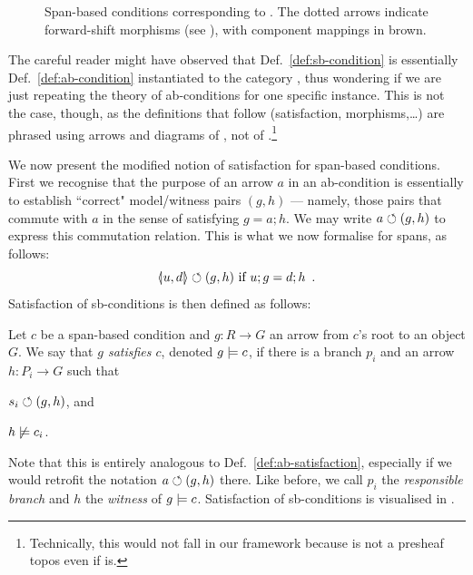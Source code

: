 \begin{figure}[t]
\centering

\vspace*{-5mm}
\caption{Span-based conditions corresponding to . The dotted arrows indicate forward-shift morphisms (see ), with component mappings in brown.}
\end{figure}

\medskip\noindent The careful reader might have observed that Def.~\ref{def:sb-condition} is essentially Def.~\ref{def:ab-condition} instantiated to the category {\SpanC}, thus wondering if we are just repeating the theory of ab-conditions for one specific instance. This is not the case, though, as the definitions that follow (satisfaction, morphisms,\ldots) are phrased using arrows and diagrams of , not of {\SpanC}.\footnote{Technically, this would not fall in our framework because {\SpanC} is not a presheaf topos even if  is.}

We now present the modified notion of satisfaction for span-based conditions. First we recognise that the purpose of an arrow $a$ in an ab-condition is essentially to establish ``correct" model/witness pairs $(g,h)$ --- namely, those pairs that commute with $a$ in the sense of satisfying $g=a;h$. We may write $a\circlearrowleft (g,h)$ to express this commutation relation. This is what we now formalise for spans, as follows:
\[ \spanof u d \commutes (g,h) \text{ if } u;g=d;h \enspace. \]
Satisfaction of sb-conditions is then defined as follows:

\begin{definition}\label{def:sb-satisfaction}
  Let $c$ be a span-based condition and $g:R\to G$ an arrow from $c$'s root to an object $G$. We say that \emph{$g$ satisfies $c$}, denoted $g\models c$, if there is a branch $p_i$ and an arrow $h:P_i\to G$ such that
  \begin{enumerate*}
  \item $s_i \circlearrowleft (g, h)$, and
  \item $h\not\models c_i$.
  \end{enumerate*}
\end{definition}
%
Note that this is entirely analogous to Def.~\ref{def:ab-satisfaction}, especially if we would retrofit the notation $a\circlearrowleft (g,h)$ there. Like before, we call $p_i$ the \emph{responsible branch} and $h$ the \emph{witness} of $g\models c$. Satisfaction of sb-conditions is visualised in .

